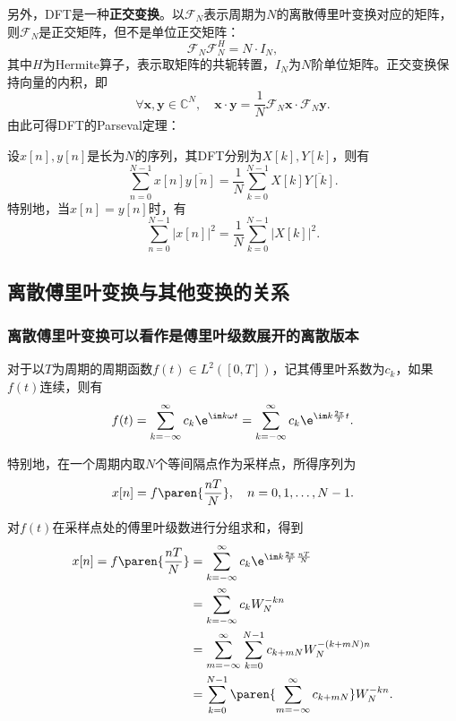 另外，DFT是一种\textbf{正交变换}。以$\mathcal{F}_N$表示周期为$N$的离散傅里叶变换对应的矩阵，则$\mathcal{F}_N$是正交矩阵，但不是单位正交矩阵：
\begin{equation}
    \mathcal{F}_N \mathcal{F}_N^H = N\cdot I_N,
\end{equation}
其中$H$为Hermite算子，表示取矩阵的共轭转置，$I_N$为$N$阶单位矩阵。正交变换保持向量的内积，即
\begin{equation}
    \forall \mathbf{x},\mathbf{y}\in\mathbb{C}^N,\quad \mathbf{x}\cdot\mathbf{y}=\frac{1}{N}\mathcal{F}_N \mathbf{x}\cdot\mathcal{F}_N \mathbf{y}.
\end{equation}
由此可得DFT的Parseval定理：
\begin{theorem}[离散傅里叶变换的Parseval定理]
    设$x[n],y[n]$是长为$N$的序列，其DFT分别为$X[k],Y[k]$，则有
    \begin{equation}
        \sum_{n=0}^{N-1}x[n]\overline{y[n]}=\frac{1}{N}\sum_{k=0}^{N-1}X[k]\overline{Y[k]}.
    \end{equation}
    特别地，当$x[n]=y[n]$时，有
    \begin{equation}
        \sum_{n=0}^{N-1}|x[n]|^2=\frac{1}{N}\sum_{k=0}^{N-1}|X[k]|^2.
    \end{equation}
\end{theorem}

\subsection{离散傅里叶变换与其他变换的关系}\label{sub:relation_of_dft}

\subsubsection{离散傅里叶变换可以看作是傅里叶级数展开的离散版本}

对于以$T$为周期的周期函数$f(t)\in L^2([0,T])$，记其傅里叶系数为$c_k$，如果$f(t)$连续，则有
\begin{equation}
    f(t)=\sum_{k=-\infty}^{\infty}c_k \e^{\im k\omega t}=\sum_{k=-\infty}^{\infty}c_k \e^{\im k\frac{2\pi}{T}t}.
\end{equation}

特别地，在一个周期内取$N$个等间隔点作为采样点，所得序列为
\begin{equation}
    x[n]=f\paren{\frac{nT}{N}},\quad n=0,1,\dots,N-1.
\end{equation}

对$f(t)$在采样点处的傅里叶级数进行分组求和，得到
\begin{align}
    x[n]=f\paren{\frac{nT}{N}}&=\sum_{k=-\infty}^{\infty}c_k \e^{\im k\frac{2\pi}{T}\frac{nT}{N}} \nonumber \\
    &=\sum_{k=-\infty}^{\infty}c_k W_N^{-kn} \nonumber \\
    &=\sum_{m=-\infty}^{\infty}\sum_{k=0}^{N-1}c_{k+mN} W_N^{-(k+mN)n} \nonumber \\
    &=\sum_{k=0}^{N-1}\paren{\sum_{m=-\infty}^{\infty}c_{k+mN}}W_N^{-kn}.
\end{align}

